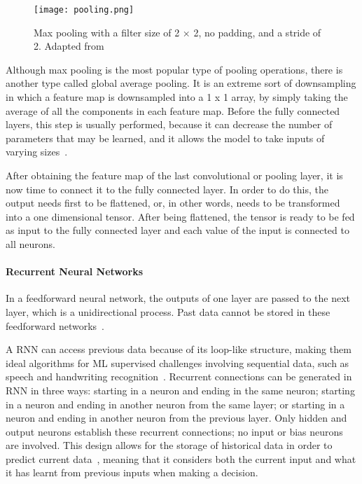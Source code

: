 \begin{figure}[htbp]
    \centering
    \texttt{[image: pooling.png]}
    \caption{Max pooling with a filter size of 2 × 2, no padding, and a stride of 2. Adapted from~\cite{Yamashita2018ConvolutionalRadiology}}
    \label{fig:pooling}
\end{figure}

Although max pooling is the most popular type of pooling operations, there is another type called global average pooling. It is an extreme sort of downsampling in which a feature map is downsampled into a 1 x 1 array, by simply taking the average of all the components in each feature map. Before the fully connected layers, this step is usually performed, because it can decrease the number of parameters that may be learned, and it allows the model to take inputs of varying sizes~\cite{Yamashita2018ConvolutionalRadiology}.

After obtaining the feature map of the last convolutional or pooling layer, it is now time to connect it to the fully connected layer. In order to do this, the output needs first to be flattened, or, in other words, needs to be transformed into a one dimensional tensor. After being flattened, the tensor is ready to be fed as input to the fully connected layer and each value of the input is connected to all neurons. 

\paragraph{Recurrent Neural Networks}

In a feedforward neural network, the outputs of one layer are passed to the next layer, which is a unidirectional process. Past data cannot be stored in these feedforward networks~\cite{Shewalkar2019PerformanceGRU}. 

A \gls{RNN} can access previous data because of its loop-like structure, making them ideal algorithms for \gls{ML} supervised challenges involving sequential data, such as speech and handwriting recognition~\cite{Ganatra2018ATools}. Recurrent connections can be generated in \gls{RNN} in three ways: starting in a neuron and ending in the same neuron; starting in a neuron and ending in another neuron from the same layer; or starting in a neuron and ending in another neuron from the previous layer. Only hidden and output neurons establish these recurrent connections; no input or bias neurons are involved. This design allows for the storage of historical data in order to predict current data~\cite{ShewalkarComparisonData}, meaning that it considers both the current input and what it has learnt from previous inputs when making a decision.

